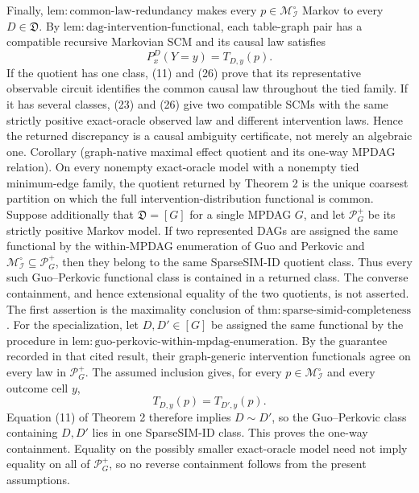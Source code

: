 Finally, \(\mathrm{lem{:}common\text{-}law\text{-}redundancy}\) makes every \(p\in\mathcal M_{\mathcal I}^{\circ}\) Markov to every \(D\in\mathfrak D\).  By \(\mathrm{lem{:}dag\text{-}intervention\text{-}functional}\), each table-graph pair has a compatible recursive Markovian SCM and its causal law satisfies
\[
 P_{x}^{D}(Y=y)=T_{D,y}(p). \tag{26}
\]
If the quotient has one class, (11) and (26) prove that its representative observable circuit identifies the common causal law throughout the tied family.  If it has several classes, (23) and (26) give two compatible SCMs with the same strictly positive exact-oracle observed law and different intervention laws.  Hence the returned discrepancy is a causal ambiguity certificate, not merely an algebraic one.
Corollary (graph-native maximal effect quotient and its one-way MPDAG relation).  On every nonempty exact-oracle model with a nonempty tied minimum-edge family, the quotient returned by Theorem 2 is the unique coarsest partition on which the full intervention-distribution functional is common.  Suppose additionally that \(\mathfrak D=[G]\) for a single MPDAG \(G\), and let \(\mathcal P_G^+\) be its strictly positive Markov model.  If two represented DAGs are assigned the same functional by the within-MPDAG enumeration of Guo and Perkovic and \(\mathcal M_{\mathcal I}^{\circ}\subseteq\mathcal P_G^+\), then they belong to the same SparseSIM-ID quotient class.  Thus every such Guo--Perkovic functional class is contained in a returned class.  The converse containment, and hence extensional equality of the two quotients, is not asserted.
The first assertion is the maximality conclusion of \(\mathrm{thm{:}sparse\text{-}simid\text{-}completeness}\).  For the specialization, let \(D,D'\in[G]\) be assigned the same functional by the procedure in \(\mathrm{lem{:}guo\text{-}perkovic\text{-}within\text{-}mpdag\text{-}enumeration}\).  By the guarantee recorded in that cited result, their graph-generic intervention functionals agree on every law in \(\mathcal P_G^+\).  The assumed inclusion gives, for every \(p\in\mathcal M_{\mathcal I}^{\circ}\) and every outcome cell \(y\),
\[
 T_{D,y}(p)=T_{D',y}(p). \tag{27}
\]
Equation (11) of Theorem 2 therefore implies \(D\sim D'\), so the Guo--Perkovic class containing \(D,D'\) lies in one SparseSIM-ID class.  This proves the one-way containment.  Equality on the possibly smaller exact-oracle model need not imply equality on all of \(\mathcal P_G^+\), so no reverse containment follows from the present assumptions.
